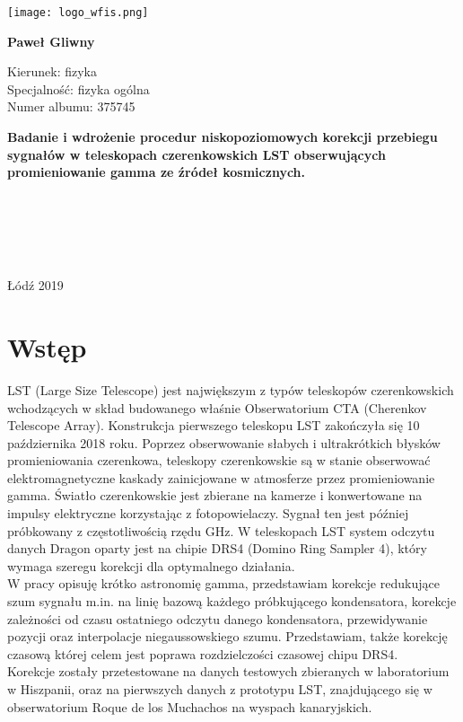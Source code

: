 \documentclass[a4paper,11pt,twoside]{article}
\renewcommand\maketitle{
\begin{titlepage}
 \begin{center}
  \texttt{[image: logo\_wfis.png]}
  
  \vspace{1cm} 
  \LARGE\textbf{Paweł Gliwny}
  
  \vspace{1cm}
  \begin{flushleft}
  \normalsize{Kierunek: fizyka} \\
  \normalsize{Specjalność: fizyka ogólna} \\
  \normalsize{Numer albumu: 375745}
  \end{flushleft} 
      
  \vspace{1cm}  
  \LARGE\textbf{{Badanie i wdrożenie procedur niskopoziomowych korekcji przebiegu sygnałów w teleskopach czerenkowskich LST obserwujących promieniowanie gamma ze źródeł kosmicznych.}}
   
   
  \vspace{2,5cm}
  \begin{flushleft}
  \normalsize\textbf{\hspace*{7,2cm}{Praca magisterska}} \\
  \normalsize{\hspace*{7,9cm}{wykonana pod kierunkiem}\\ \hspace*{7,9cm}{prof. UŁ dr hab.} \\ \hspace*{7,9cm}{Juliana Sitarka} \\ \hspace*{7,9cm}{w Katedrze Astrofizyki}} 
  \end{flushleft}
   \begin{flushright}
   \end{flushright}

  
  \vfill
  \normalsize{Łódź 2019}
  \end{center}
\end{titlepage}}
\begin{document}
\maketitle
\tableofcontents
\newpage
\setcounter{page}{1}
\section{Wstęp}
LST (Large Size Telescope) jest największym z typów teleskopów czerenkowskich wchodzących w skład budowanego właśnie Obserwatorium CTA (Cherenkov Telescope Array). Konstrukcja pierwszego teleskopu LST zakończyła się 10 października 2018 roku. Poprzez obserwowanie słabych i ultrakrótkich błysków promieniowania czerenkowa, teleskopy czerenkowskie są w stanie obserwować elektromagnetyczne kaskady zainicjowane w atmosferze przez promieniowanie gamma. Światło czerenkowskie jest zbierane na kamerze i konwertowane na impulsy elektryczne korzystając z fotopowielaczy. Sygnał ten jest później próbkowany z częstotliwością rzędu GHz. W teleskopach LST system odczytu danych Dragon oparty jest na chipie DRS4 (Domino Ring Sampler 4), który wymaga szeregu korekcji dla optymalnego działania. \\
W pracy opisuję krótko astronomię gamma, przedstawiam korekcje redukujące szum sygnału m.in. na linię bazową każdego próbkującego kondensatora, korekcje zależności od czasu ostatniego odczytu danego kondensatora, przewidywanie pozycji oraz interpolacje niegaussowskiego szumu. Przedstawiam, także korekcję czasową której celem jest poprawa rozdzielczości czasowej chipu DRS4. \\
Korekcje zostały przetestowane na danych testowych zbieranych w laboratorium w Hiszpanii, oraz na pierwszych danych z prototypu LST, znajdującego się w obserwatorium Roque de los Muchachos na wyspach kanaryjskich.  
\newpage
\end{document}
